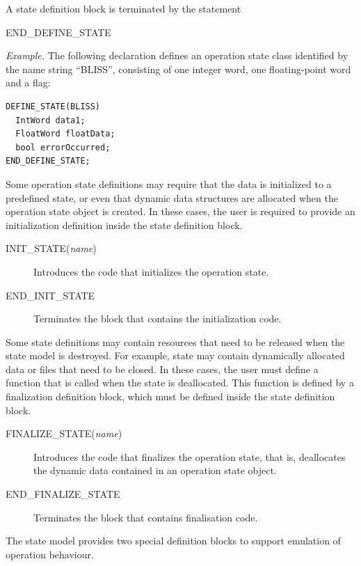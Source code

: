 \documentclass[a4paper,twoside]{tceusermanual}
\begin{document}
A state definition block is terminated by the statement
\begin{description}
\item[END\_DEFINE\_STATE]
\end{description}

\emph{Example.} The following declaration defines an operation state class
identified by the name string ``BLISS'', consisting of one integer word, one
floating-point word and a flag:
\begin{verbatim}
DEFINE_STATE(BLISS) 
  IntWord data1;
  FloatWord floatData;
  bool errorOccurred;
END_DEFINE_STATE;
\end{verbatim}


Some operation state definitions may require that the data is initialized to
a predefined state, or even that dynamic data structures are allocated when
the operation state object is created. In these cases, the user is required
to provide an initialization definition inside the state definition block.
\begin{description}
\item[INIT\_STATE(\emph{name})]%
  Introduces the code that initializes the operation state.
\item[END\_INIT\_STATE]%
  Terminates the block that contains the initialization code.
\end{description}

Some state definitions may contain resources that need to be released when the
state model is destroyed. For example, state may contain dynamically
allocated data or files that need to be closed. In these cases, the user
must define a function that is called when the state is deallocated. This
function is defined by a finalization definition block, which must be
defined inside the state definition block.
\begin{description}
\item[FINALIZE\_STATE(\emph{name})]%
  Introduces the code that finalizes the operation state, that is,
  deallocates the dynamic data contained in an operation state object.
\item[END\_FINALIZE\_STATE]%
  Terminates the block that contains finalisation code.
\end{description}

The state model provides two special definition blocks to support emulation
of operation behaviour.
\end{document}
